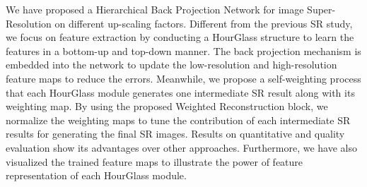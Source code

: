\documentclass[10pt,twocolumn,letterpaper]{article}
\begin{document}
We have proposed a Hierarchical Back Projection Network for image Super-Resolution on different up-scaling factors. Different from the previous SR study, we focus on feature extraction by conducting a HourGlass structure to learn the features in a bottom-up and top-down manner. The back projection mechanism is embedded into the network to update the low-resolution and high-resolution feature maps to reduce the errors. Meanwhile, we propose a self-weighting process that each HourGlass module generates one intermediate SR result along with its weighting map. By using the proposed Weighted Reconstruction block, we normalize the weighting maps to tune the contribution of each intermediate SR results for generating the final SR images. Results on quantitative and quality evaluation show its advantages over other approaches. Furthermore, we have also visualized the trained feature maps to illustrate the power of feature representation of each HourGlass module. 


{\small


}
\end{document}
